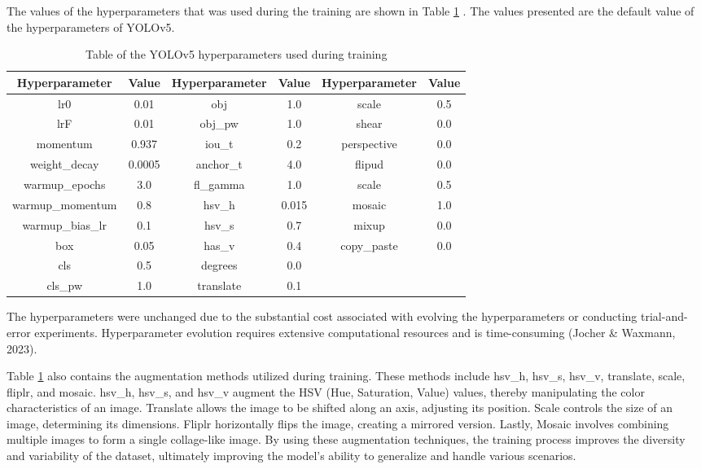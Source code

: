 The values of the hyperparameters that was used during the training are shown in Table \ref{tab:hyperparameters} . The values presented are the default value of the hyperparameters of YOLOv5.

\begin{table}[ht]   %
	\centering
	\caption{Table of the YOLOv5 hyperparameters used during training} \vspace{0.25em}
	\begin{tabular}{c|c|c|c|c|c} \hline
		\centering \textbf{Hyperparameter} & \textbf{Value} &\textbf{Hyperparameter} & \textbf{Value} & \textbf{Hyperparameter} & \textbf{Value} \\ \hline
		lr0  & 0.01   & obj & 1.0 & scale &0.5 \\
		lrF  & 0.01   & obj\_pw & 1.0 & shear &0.0 \\
		momentum  & 0.937   & iou\_t & 0.2 & perspective &0.0 \\
		weight\_decay  & 0.0005  & anchor\_t & 4.0 & flipud &0.0 \\
		warmup\_epochs  & 3.0  & fl\_gamma & 1.0 & scale &0.5 \\
		warmup\_momentum  & 0.8   & hsv\_h & 0.015 & mosaic &1.0 \\
		warmup\_bias\_lr  & 0.1   & hsv\_s & 0.7 & mixup &0.0 \\
		box  & 0.05   & has\_v & 0.4 & copy\_paste &0.0 \\
		cls  & 0.5   & degrees & 0.0 &  & \\
		cls\_pw  & 1.0   & translate & 0.1 &  &  \\
		 \hline
		
	\end{tabular}
	\label{tab:hyperparameters}
\end{table}
\FloatBarrier

The hyperparameters were unchanged due to the substantial cost associated with evolving the hyperparameters or conducting trial-and-error experiments. Hyperparameter evolution requires extensive computational resources and is time-consuming (Jocher \& Waxmann, 2023).

Table \ref{tab:hyperparameters} also contains the augmentation methods utilized during training. These methods include hsv\_h, hsv\_s, hsv\_v, translate, scale, fliplr, and mosaic. hsv\_h, hsv\_s, and hsv\_v augment the HSV (Hue, Saturation, Value) values, thereby manipulating the color characteristics of an image. Translate allows the image to be shifted along an axis, adjusting its position. Scale controls the size of an image, determining its dimensions. Fliplr horizontally flips the image, creating a mirrored version. Lastly, Mosaic involves combining multiple images to form a single collage-like image. By using these augmentation techniques, the training process improves the diversity and variability of the dataset, ultimately improving the model's ability to generalize and handle various scenarios.

